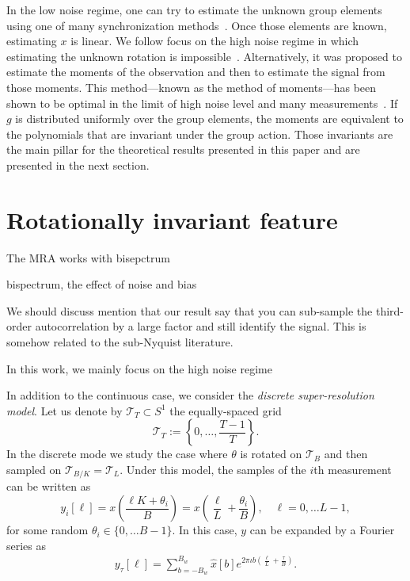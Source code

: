\documentclass[english,12pt]{article}
\newcommand{\I}{\iota}
\newcommand{\tB}{B_w}
\newcommand{\T}{\mathcal{T}}
\newcommand{\SR}{super-resolution }
\numberwithin{equation}{section}
\numberwithin{thm}{section} %
\begin{document}
In the low noise regime, one can try to estimate the unknown group elements using one of many synchronization methods~\cite{singer2011angular,bandeira2015non,boumal2016nonconvex,chen2018projected,singer2011three}.
Once those elements are known, estimating $x$ is linear. We follow focus on the high noise regime in which estimating the unknown rotation is impossible~\cite{bendory2018toward,aguerrebere2016fundamental}.
Alternatively, it was proposed to estimate the moments of the observation and then to estimate the signal from those moments. This method---known as the method of moments---has been shown to be optimal in the limit of high noise level and many measurements~\cite{bandeira2017optimal,bandeira2017estimation,abbe2018multireference,abbe2018estimation}. If $g$ is distributed uniformly over the group elements, the moments are equivalent to the polynomials that are invariant under the group action. Those invariants are the main pillar for the theoretical results presented in this paper and are presented in the next section.


\section{Rotationally invariant feature}

The MRA works with bisepctrum

 bispectrum, the effect of noise and bias

We should discuss mention that our result say that you can sub-sample the third-order autocorrelation by a large factor and still identify the signal. This is somehow related to the sub-Nyquist literature. 




In this work, we mainly focus on the high noise regime 


In addition to the continuous case, we consider the \emph{discrete \SR model}. Let us denote by $\T_T\subset S^1$ the equally-spaced grid 
\begin{equation} \label{eq:grid}
\mathcal{T}_T:=\left\{0,\ldots,\frac{T-1}{T}\right\}.
\end{equation}
In the discrete mode we study the case where $\theta$ is rotated on $\T_B$ and then sampled on $\T_{B/K}=\T_{L}$.
Under this model, the samples of the $i$th measurement can be  written as
\begin{equation}
y_i[\ell] = x\left(\frac{\ell K+\theta_i}{B}\right)=x\left(\frac{\ell}{L} + \frac{\theta_i}{B}\right), \quad \ell=0,\ldots L-1,
\end{equation}
for some random $\theta_i\in\{0,\ldots B-1\}$. 
In this case, $y$ can be expanded by a Fourier series as
\begin{eqnarray}
y_\tau[\ell] = \sum_{b=-\tB}^{\tB}\hat{x}[b]e^{2\pi\I b \left(\frac{\ell}{L} + \frac{\tau}{B}\right) }.
\end{eqnarray}
\end{document}
